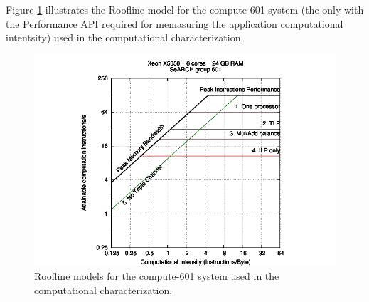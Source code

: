 Figure \ref{fig:Roofline601} illustrates the Roofline model for the compute-601 system (the only with the Performance API required for memasuring the application computational intentsity) used in the \ttDilepKinFit computational characterization.

\begin{figure}[!htp]
	\begin{center}
		\includegraphics[scale=0.7]{../../common/601.pdf}
		\caption{Roofline models for the compute-601 system used in the \ttDilepKinFit computational characterization.}
		\label{fig:Roofline601}
	\end{center}
\end{figure}


